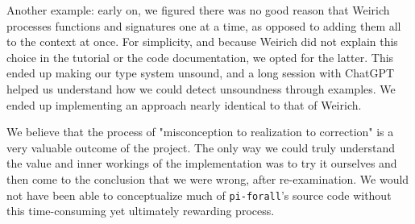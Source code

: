 Another example: early on, we figured there was no good reason that Weirich
processes functions and signatures one at a time, as opposed to adding them all
to the context at once. For simplicity, and because Weirich did not explain
this choice in the tutorial or the code documentation, we opted for the latter.
This ended up making our type system unsound, and a long session with ChatGPT
helped us understand how we could detect unsoundness through examples. We ended
up implementing an approach nearly identical to that of Weirich.

We believe that the process of "misconception to realization to correction" is a very valuable outcome of the project. 
The only way we could truly understand the value and inner workings of the implementation was to try it ourselves and then come to the conclusion that we were wrong, after re-examination.
We would not have been able to conceptualize much of \texttt{pi-forall}'s source code without this time-consuming yet ultimately rewarding process.






